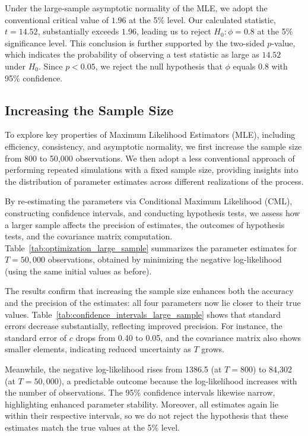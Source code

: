 \documentclass[a4paper,12pt]{article}
\begin{document}
Under the large-sample asymptotic normality of the MLE, we adopt the conventional critical value of \(1.96\) at the 5\% level. Our calculated statistic, \(t = 14.52\), substantially exceeds \(1.96\), leading us to reject \(H_0: \phi = 0.8\) at the 5\% significance level. This conclusion is further supported by the two-sided \(p\)-value, which indicates the probability of observing a test statistic as large as \(14.52\) under \(H_0\). Since \(p < 0.05\), we reject the null hypothesis that \(\phi\) equals 0.8 with 95\% confidence.

\subsection{Increasing the Sample Size}
To explore key properties of Maximum Likelihood Estimators (MLE), including efficiency, consistency, and asymptotic normality, we first increase the sample size from 800 to 50{,}000 observations. We then adopt a less conventional approach of performing repeated simulations with a fixed sample size, providing insights into the distribution of parameter estimates across different realizations of the process.

By re-estimating the parameters via Conditional Maximum Likelihood (CML), constructing confidence intervals, and conducting hypothesis tests, we assess how a larger sample affects the precision of estimates, the outcomes of hypothesis tests, and the covariance matrix computation. Table~\ref{tab:optimization_large_sample} summarizes the parameter estimates for \(T=50{,}000\) observations, obtained by minimizing the negative log-likelihood (using the same initial values as before).

The results confirm that increasing the sample size enhances both the accuracy and the precision of the estimates: all four parameters now lie closer to their true values. Table~\ref{tab:confidence_intervals_large_sample} shows that standard errors decrease substantially, reflecting improved precision. For instance, the standard error of \(c\) drops from 0.40 to 0.05, and the covariance matrix also shows smaller elements, indicating reduced uncertainty as \(T\) grows.

Meanwhile, the negative log-likelihood rises from 1386.5 (at \(T=800\)) to 84{,}302 (at \(T=50{,}000\)), a predictable outcome because the log-likelihood increases with the number of observations. The 95\% confidence intervals likewise narrow, highlighting enhanced parameter stability. Moreover, all estimates again lie within their respective intervals, so we do not reject the hypothesis that these estimates match the true values at the 5\% level.
\end{document}
